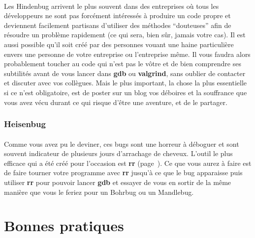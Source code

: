 \paragraph{}

Les Hindenbug arrivent le plus souvent dans des entreprises où tous les
développeurs ne sont pas forcément intéressés à produire un code propre et
deviennent facilement partisans d'utiliser des méthodes ``douteuses'' afin de
résoudre un problème rapidement (ce qui sera, bien sûr, jamais votre cas). Il
est aussi possible qu'il soit créé par des personnes vouant une haine
particulière envers une personne de votre entreprise ou l'entreprise même. Il
vous faudra alors probablement toucher au code qui n'est pas le vôtre et de
bien comprendre ses subtilités avant de vous lancer dans \textbf{gdb} ou
\textbf{valgrind}, sans oublier de contacter et discuter avec vos collègues.
Mais le plus important, la chose la plus essentielle si ce n'est obligatoire,
est de poster sur un blog vos déboires et la souffrance que vous avez vécu
durant ce qui risque d'être une aventure, et de le partager.

\subsubsection{Heisenbug}

\paragraph{}

Comme vous avez pu le deviner, ces bugs sont une horreur à déboguer et sont
souvent indicateur de plusieurs jours d'arrachage de cheveux. L'outil le plus
efficace qui a été créé pour l'occasion est \textbf{rr}
(page~\pageref{part:rr}). Ce que vous aurez à faire est de faire tourner votre
programme avec \textbf{rr} jusqu'à ce que le bug apparaisse puis utiliser
\textbf{rr} pour pouvoir lancer \textbf{gdb} et essayer de vous en sortir de la
même manière que vous le feriez pour un Bohrbug ou un Mandlebug.

\section{Bonnes pratiques}

